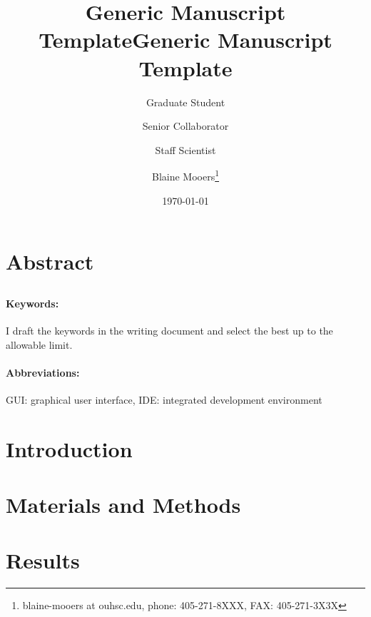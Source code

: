 \documentclass[11pt,letterpaper]{article}
\date{\today}
\title{Generic Manuscript Template}
\begin{document}
\author[1]{Graduate Student}
\author[2]{Senior Collaborator}
\author[3]{Staff Scientist}
\author[1,2,3]{Blaine Mooers\thanks{blaine-mooers at ouhsc.edu, phone: 405-271-8XXX, FAX: 405-271-3X3X}}
\title{Generic Manuscript Template}
\thispagestyle{plain}
\maketitle
{} %
\newpage
{}
\linenumbers

\section*{Abstract}
\begin{singlespace}
\lipsum[1]
\end{singlespace}
\subsection*{}
\label{sec:org290c078}
\paragraph{ Keywords:} I draft the keywords in the writing document and select the best up to the allowable limit.
\paragraph{Abbreviations:} GUI: graphical user interface, IDE: integrated development environment


\section*{Introduction}
\label{sec:org0a79292}
\lipsum[1-10]


\section*{Materials and Methods}
\label{sec:orgcea33f2}

\section*{Results}
\label{sec:org6c3d0cc}
\end{document}
